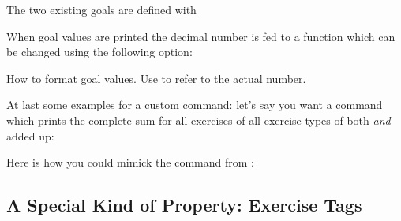 \documentclass{xsim-manual}
\begin{document}
The two existing goals are defined with
\begin{sourcecode}
\end{sourcecode}

When goal values are printed the decimal number is fed to a function which can
be changed using the following option:
\begin{options}
    How to format goal values.  Use  to refer to the actual number.
\end{options}

At last some examples for a custom command: let's say you want a command which
prints the complete sum for all exercises of all exercise types of both
 \emph{and}  added up:
\begin{sourcecode}
  \NewDocumentCommand{}
\end{sourcecode}
Here is how you could mimick the command  from
:
\begin{sourcecode}
  \NewDocumentCommand{}
\end{sourcecode}


\subsection{A Special Kind of Property: Exercise Tags}\label{sec:tags}
\end{document}
